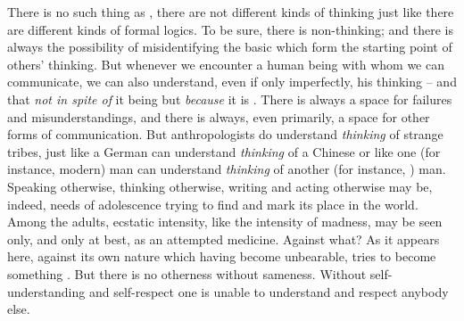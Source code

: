 There is no such thing as , there are not different
kinds of thinking just like there are different kinds of formal logics.  To be
sure, there is non-thinking; and there is always the possibility of
misidentifying the basic  which form the starting point of
others' thinking. But whenever we encounter a human being with whom we can
communicate, we can also understand, even if only imperfectly, his thinking --
and that {\em not in spite of} it being  but {\em because} it is
. There is always a space for failures and misunderstandings, and
there is always, even primarily, a space for other forms of communication. But
anthropologists do understand {\em thinking} of strange tribes, just like a
German can understand {\em thinking} of a Chinese or like one (for instance,
modern) man can understand {\em thinking} of another (for instance,
) man.
Speaking otherwise, thinking otherwise, writing and acting otherwise may be,
indeed,  needs of adolescence trying to find and mark its place in
the world.  Among the adults, ecstatic intensity, like the intensity of madness,
may be seen only, and only at best, as an attempted medicine. Against what? As
it appears here, against its own nature which having become unbearable, tries to
become something . But there is no otherness without sameness.
Without self-understanding and self-respect one is unable to understand and
respect anybody else.


\label{objectivisticillusion}

